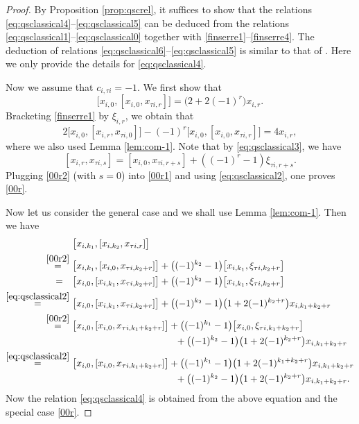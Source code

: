 \documentclass[11pt,reqno]{amsart}
\numberwithin{equation}{section}
\theoremstyle{definition}
\theoremstyle{remark}
\newcommand{\beq}{\begin{equation}}
\newcommand{\eeq}{\end{equation}}
\begin{document}
\begin{proof}
By Proposition \ref{prop:qscrel}, it suffices to show that the relations \eqref{eq:qsclassical4}--\eqref{eq:qsclassical5} can be deduced from the relations \eqref{eq:qsclassical1}--\eqref{eq:qsclassical0} together with \eqref{finserre1}--\eqref{finserre4}. The deduction of relations \eqref{eq:qsclassical6}--\eqref{eq:qsclassical5} is similar to that of \cite[Prop.~2.8]{KLWZ23b}. Here we only provide the details for  \eqref{eq:qsclassical4}.

Now we assume that $c_{i,\tau i}=-1$. We first show that
\beq\label{00r}
\big[x_{i,0},[x_{i,0},x_{\tau i,r}]\big]=\big(2+2(-1)^r\big)x_{i,r}.
\eeq
Bracketing \eqref{finserre1} by $\xi_{i,r}$, we obtain that 
\beq\label{00r1}
2\big[x_{i,0},[x_{i,r},x_{\tau i,0}]\big]-(-1)^r\big[x_{i,0},[x_{i,0},x_{\tau i,r}]\big]=4x_{i,r},
\eeq
where we also used Lemma \ref{lem:com-1}. Note that by \eqref{eq:qsclassical3}, we have
\beq\label{00r2}
[x_{i,r},x_{\tau i,s}]=[x_{i,0},x_{\tau i,r+s}]+((-1)^r-1)\xi_{\tau i,r+s}.
\eeq
Plugging \eqref{00r2} (with $s=0$) into \eqref{00r1} and using \eqref{eq:qsclassical2}, one proves \eqref{00r}. 

Now let us consider the general case and we shall use Lemma \ref{lem:com-1}. Then we have
\begin{align*}
&\ \big[x_{i,k_1},[x_{i,k_2},x_{\tau i,r}]\big]\\
\stackrel{\eqref{00r2}}{=}&\ \big[x_{i,k_1},[x_{i,0},x_{\tau i,k_2+r}]\big]+\big((-1)^{k_2}-1\big)\big[x_{i,k_1},\xi_{\tau i,k_2+r}\big]\\
=\hskip 0.24cm& \ \big[x_{i,0},[x_{i,k_1},x_{\tau i,k_2+r}]\big]+\big((-1)^{k_2}-1\big)\big[x_{i,k_1},\xi_{\tau i,k_2+r}\big]\\
\stackrel{\eqref{eq:qsclassical2}}{=} & \ \big[x_{i,0},[x_{i,k_1},x_{\tau i,k_2+r}]\big]+\big((-1)^{k_2}-1\big)\big(1+2(-1)^{k_2+r}\big)x_{i,k_1+k_2+r}\\
\stackrel{\eqref{00r2}}{=}&\ \big[x_{i,0},[x_{i,0},x_{\tau i,k_1+k_2+r}]\big]+\big((-1)^{k_1}-1\big)\big[x_{i,0},\xi_{\tau i,k_1+k_2+r}\big]\\
&\hskip 3.95cm +\big((-1)^{k_2}-1\big)\big(1+2(-1)^{k_2+r}\big)x_{i,k_1+k_2+r}\\
\stackrel{\eqref{eq:qsclassical2}}{=}&\ \big[x_{i,0},[x_{i,0},x_{\tau i,k_1+k_2+r}]\big]+\big((-1)^{k_1}-1\big)\big(1+2(-1)^{k_1+k_2+r}\big)x_{i,k_1+k_2+r}\\
&\hskip 3.95cm +\big((-1)^{k_2}-1\big)\big(1+2(-1)^{k_2+r}\big)x_{i,k_1+k_2+r}.
\end{align*}
Now the relation \eqref{eq:qsclassical4} is obtained from the above equation and the special case \eqref{00r}.
\end{proof}
\end{document}

